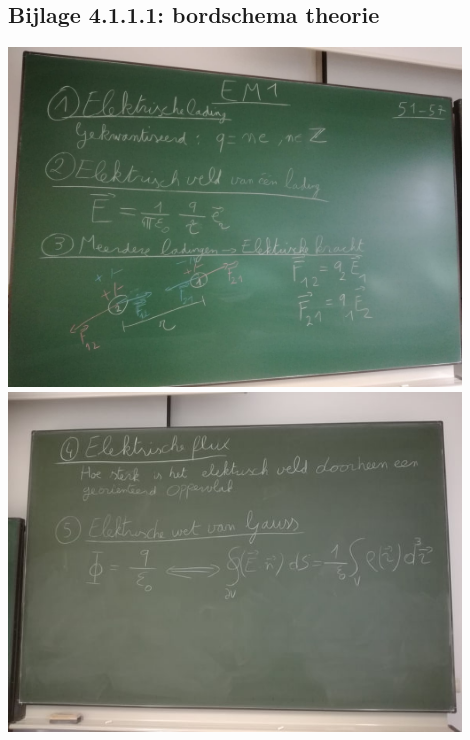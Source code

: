 \subsection*{Bijlage 4.1.1.1: bordschema theorie}
\begin{center}
	\includegraphics[width=0.9\textwidth]{Bord1a}
\includegraphics[width=0.9\textwidth]{Bord1b}
\end{center}
\newpage








